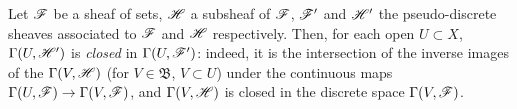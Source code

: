 \begin{env}[3.8.3]
\label{0.3.8.3}
Let $\mathscr{F}$ be a sheaf of sets, $\mathscr{H}$ a subsheaf of $\mathscr{F}$, $\mathscr{F}'$ and
$\mathscr{H}'$ the pseudo-discrete sheaves associated to $\mathscr{F}$ and $\mathscr{H}$
respectively. Then, for each open $U\subset X$, $\Gamma(U,\mathscr{H}')$ is
{\em closed} in $\Gamma(U,\mathscr{F}')$: indeed, it is the intersection of the
inverse images of the $\Gamma(V,\mathscr{H})$ (for $V\in\mathfrak{B}$, $V\subset U$)
under the continuous maps $\Gamma(U,\mathscr{F})\to\Gamma(V,\mathscr{F})$, and
$\Gamma(V,\mathscr{H})$ is closed in the discrete space $\Gamma(V,\mathscr{F})$.
\end{env}

